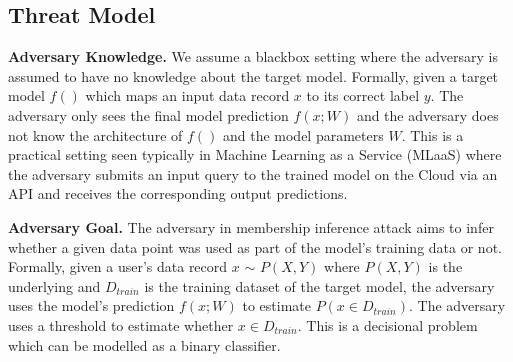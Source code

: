\begin{table}[!htb]
\caption{Custom architectures used for training FashionMNIST, Location and Purchase100 datasets.}
\centering
\renewcommand\arraystretch{1.5}
\fontsize{6.7pt}{6.7pt}\selectfont
{}
\label{tab:architectures}
\end{table}


\subsection{Threat Model}

\noindent\textbf{Adversary Knowledge.} We assume a blackbox setting where the adversary is assumed to have no knowledge about the target model.
Formally, given a target model $f()$ which maps an input data record $x$ to its correct label $y$.
The adversary only sees the final model prediction $f(x;W)$ and the adversary does not know the architecture of $f()$ and the model parameters $W$.
This is a practical setting seen typically in Machine Learning as a Service (MLaaS) where the adversary submits an input query to the trained model on the Cloud via an API and receives the corresponding output predictions.

\noindent\textbf{Adversary Goal.} The adversary in membership inference attack aims to infer whether a given data point was used as part of the model's training data or not.
Formally, given a user's data record $x$ $\sim$ $P(X,Y)$ where $P(X,Y)$ is the underlying and $D_{train}$ is the training dataset of the target model, the adversary uses the model's prediction $f(x;W)$ to estimate $P(x \in D_{train})$.
The adversary uses a threshold to estimate whether $x \in D_{train}$. This is a decisional problem which can be modelled as a binary classifier.

